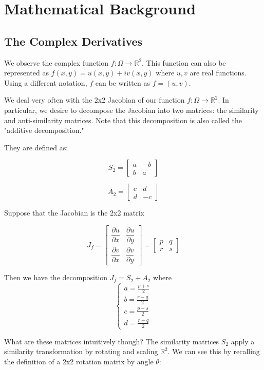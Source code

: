 \section{Mathematical Background}

\subsection{The Complex Derivatives}

We observe the complex function $f: \Omega \rightarrow \mathbb{R}^2$. This function can also be represented as $f(x,y) = u(x,y) + i v(x,y)$ where $u,v$ are real functions. Using a different notation, $f$ can be written as $f = (u,v)$.

We deal very often with the 2x2 Jacobian of our function $f: \Omega \rightarrow \mathbb{R}^2$. In particular, we desire to decompose the Jacobian into two matrices: the similarity and anti-similarity matrices. Note that this decomposition is also called the "additive decomposition." 

They are defined as:

$$S_2 = \begin{bmatrix}
a & -b \\
b & a
\end{bmatrix}$$

$$A_2 = \begin{bmatrix}
c & d \\
d & -c
\end{bmatrix}$$

Suppose that the Jacobian is the 2x2 matrix 

$$J_f = \begin{bmatrix}
\dfrac{\partial u}{\partial x} & \dfrac{\partial u}{\partial y} \\
\dfrac{\partial v}{\partial x} & \dfrac{\partial v}{\partial y}
\end{bmatrix}
= \begin{bmatrix}
p & q \\ 
r & s
\end{bmatrix}$$

Then we have the decomposition $J_f = S_2 + A_2$ where 
$$\begin{cases}
a = \frac{p+s}{2} \\
b = \frac{r-q}{2} \\
c = \frac{p-s}{2} \\
d = \frac{r+q}{2}
\end{cases}$$


What are these matrices intuitively though? The similarity matrices $S_2$ apply a similarity transformation by rotating and scaling $\mathbb{R}^2$. We can see this by recalling the definition of a 2x2 rotation matrix by angle $\theta$:


